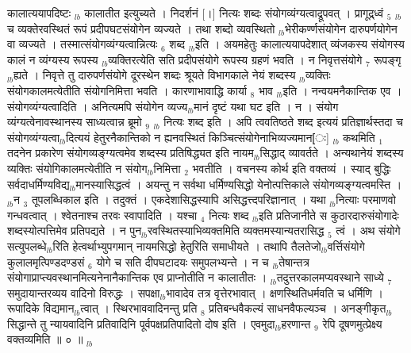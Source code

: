 \documentclass[article,12pt,a4paper]{memoir}%
\newcounter{parCount}
\begin{document}
कालात्ययापदिष्टः {\tiny $_{lb}$} \leavevmode{} कालातीत इत्युच्यते । निदर्शनं [।] नित्यः शब्दः संयोगव्यंग्यत्वाद्रूपवत् । प्रागूद्र्ध्वं {\tiny $_{5}$} {\tiny $_{lb}$} च व्यक्तेरवस्थितं रूपं प्रदीपघटसंयोगेन व्यज्यते । तथा शब्दो व्यवस्थितो {\tiny $_{lb}$}भेरीकर्ण्णसंयोगेन दारुपर्णयोगेन वा व्यज्यते । तस्मात्संयोगव्यंग्यत्वान्नित्यः {\tiny $_{6}$} शब्द {\tiny $_{lb}$}इति । अयमहेतुः कालात्ययापदेशात् व्यंजकस्य संयोगस्य कालं न व्यंग्यस्य रूपस्य {\tiny $_{lb}$}व्यक्तिरत्येति सति प्रदीपसंयोगे रूपस्य ग्रहणं भवति । न निवृत्तसंयोगे {\tiny $_{7}$} रूपङ्गृ{\tiny $_{lb}$}ह्यते । निवृत्ते तु दारुपर्णसंयोगे दूरस्थेन शब्दः श्रूयते विभागकाले नेयं शब्दस्य {\tiny $_{lb}$}व्यक्तिः संयोगकालमत्येतीति संयोगनिमित्ता भवति । कारणाभावाद्धि कार्या {\tiny $_{8}$} भाव {\tiny $_{lb}$}इति । नन्वयमनैकान्तिक एव । संयोगव्यंग्यत्वादिति । अनित्यमपि संयोगेन व्यज्य{\tiny $_{lb}$}मानं दृष्टं यथा घट इति । न । संयोग व्यंग्यत्वेनावस्थानस्य साध्यत्वान्न ब्रूमो {\tiny $_{9}$} \leavevmode{} {\tiny $_{lb}$} नित्यः शब्द इति । अपि त्ववतिष्ठते शब्द इत्ययं प्रतिज्ञार्थस्तदा च संयोगव्यंग्यत्वा{\tiny $_{lb}$}दित्ययं हेतुरनैकान्तिको न ह्यनवस्थितं किञ्चित्संयोगेनाभिव्यज्यमान[ः] {\tiny $_{lb}$} कथमिति {\tiny $_{1}$} तदनेन प्रकारेण संयोगव्यङ्ग्यत्वमेव शब्दस्य प्रतिषिद्ध्यत इति नायम{\tiny $_{lb}$}सिद्धाद् व्यावर्तते । अन्यथानेयं शब्दस्य व्यक्तिः संयोगिकालमत्येतीति न संयोग{\tiny $_{lb}$}निमित्ता {\tiny $_{2}$} भवतीति । वचनस्य कोर्थ इति वक्तव्यं । स्याद् बुद्धिः सर्वदाधर्मिण्यविद्य{\tiny $_{lb}$}मानस्यासिद्धत्वं । अयन्तु न सर्वथा धर्मिण्यसिद्धो येनोत्पत्तिकाले संयोगव्यङ्ग्यत्वमस्ति । {\tiny $_{lb}$}न {\tiny $_{3}$} तूपलब्धिकाल इति । तदुक्तं । एकदेशासिद्धस्यापि असिद्धत्त्दपरिज्ञानात् । यथा {\tiny $_{lb}$}नित्याः परमाणवो गन्धवत्वात् । श्वेतनाश्च तरवः स्वापादिति । यश्चा {\tiny $_{4}$} नित्यः शब्द {\tiny $_{lb}$}इति प्रतिजानीते स कुठारदारुसंयोगादेः शब्दस्योत्पत्तिमेव प्रतिपद्यते । न पुन{\tiny $_{lb}$}रवस्थितस्याभिव्यक्तमिति व्यक्तमस्यान्यतरासिद्ध {\tiny $_{5}$} त्वं । अथ संयोगे सत्युपलब्धे{\tiny $_{lb}$}रिति हेत्वर्थाभ्युपगमान् नायमसिद्धो हेतुरिति समाधीयते । तथापि तैलतेजो{\tiny $_{lb}$}वर्त्तिसंयोगे कुलालमृत्पिण्डदण्डसं {\tiny $_{6}$} योगे च सति दीपघटादयः समुपलभ्यन्ते । न च {\tiny $_{lb}$}तेषान्तत्र संयोगाप्राप्त्यवस्थानमित्यनेनानैकान्तिक एव प्राप्नोतीति न कालातीतः । {\tiny $_{lb}$}तदुत्तरकालमप्यवस्थाने साध्ये {\tiny $_{7}$} समुदायान्तरव्यय  वादिनो विरुद्धः । सपक्षा{\tiny $_{lb}$}भावादेव तत्र वृत्तेरभावात् । क्षणस्थितिधर्मवति च धर्मिणि । रूपादिके विद्यमान{\tiny $_{lb}$}त्वात् । स्थिरभाववादिनन्तु प्रति {\tiny $_{8}$} प्रतिबन्धवैकल्यं साधनवैफल्यञ्च । अनङ्गीकृत{\tiny $_{lb}$}सिद्धान्ते तु न्यायवादिनि प्रतिवादिनि पूर्वपक्षप्रतिपादितो दोष इति । एवमुदा{\tiny $_{lb}$}हरणान्त {\tiny $_{9}$} \leavevmode{} रेपि दूषणमुत्प्रेक्ष्य वक्तव्यमिति ॥ ० ॥
	{}
	\pend%
      {\tiny $_{lb}$}
\end{document}

